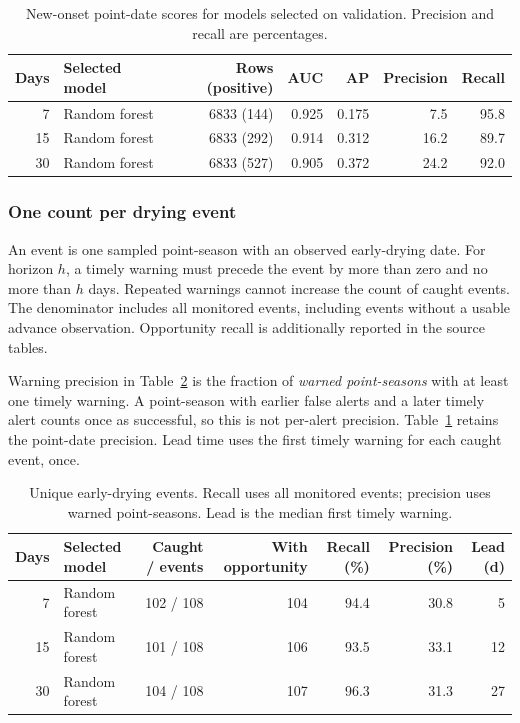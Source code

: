 \begin{table}[H]
\centering
\footnotesize
\caption{New-onset point-date scores for models selected on validation. Precision and recall are percentages.}
\label{tab:r_onset_metrics}
\begin{tabularx}{\textwidth}{@{}rXrrrrr@{}}
\toprule
\textbf{Days} & \textbf{Selected model} & \textbf{Rows (positive)} & \textbf{AUC} & \textbf{AP} & \textbf{Precision} & \textbf{Recall} \\
\midrule
7 & Random forest & 6833 (144) & 0.925 & 0.175 & 7.5 & 95.8 \\
15 & Random forest & 6833 (292) & 0.914 & 0.312 & 16.2 & 89.7 \\
30 & Random forest & 6833 (527) & 0.905 & 0.372 & 24.2 & 92.0 \\
\bottomrule
\end{tabularx}
\end{table}


\subsubsection{One count per drying event}

An event is one sampled point-season with an observed early-drying date. For horizon $h$, a timely warning must precede the event by more than zero and no more than $h$ days. Repeated warnings cannot increase the count of caught events. The denominator includes all monitored events, including events without a usable advance observation. Opportunity recall is additionally reported in the source tables.

Warning precision in Table~\ref{tab:r_unique_events} is the fraction of \emph{warned point-seasons} with at least one timely warning. A point-season with earlier false alerts and a later timely alert counts once as successful, so this is not per-alert precision. Table~\ref{tab:r_onset_metrics} retains the point-date precision. Lead time uses the first timely warning for each caught event, once.

\begin{table}[H]
\centering
\footnotesize
\caption{Unique early-drying events. Recall uses all monitored events; precision uses warned point-seasons. Lead is the median first timely warning.}
\label{tab:r_unique_events}
\begin{tabularx}{\textwidth}{@{}rXrrrrr@{}}
\toprule
\textbf{Days} & \textbf{Selected model} & \textbf{Caught / events} & \textbf{With opportunity} & \textbf{Recall (\%)} & \textbf{Precision (\%)} & \textbf{Lead (d)} \\
\midrule
7 & Random forest & 102 / 108 & 104 & 94.4 & 30.8 & 5 \\
15 & Random forest & 101 / 108 & 106 & 93.5 & 33.1 & 12 \\
30 & Random forest & 104 / 108 & 107 & 96.3 & 31.3 & 27 \\
\bottomrule
\end{tabularx}
\end{table}


